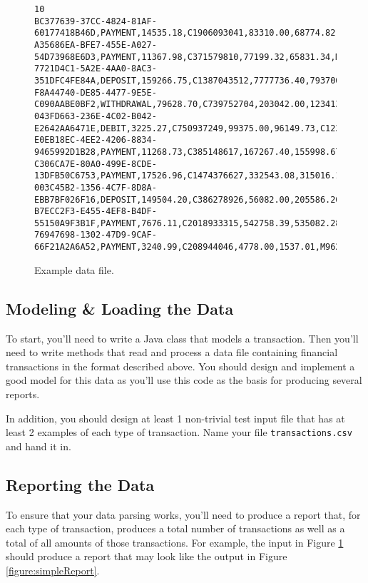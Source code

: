 \documentclass[12pt]{scrartcl}
\begin{document}
\begin{figure}[ht]
\begin{verbatim}
10
BC377639-37CC-4824-81AF-60177418B46D,PAYMENT,14535.18,C1906093041,83310.00,68774.82,M95867054
A35686EA-BFE7-455E-A027-54D73968E6D3,PAYMENT,11367.98,C371579810,77199.32,65831.34,M1932650331
7721D4C1-5A2E-4AA0-8AC3-351DFC4FE84A,DEPOSIT,159266.75,C1387043512,7777736.40,7937003.15,C553899299
F8A44740-DE85-4477-9E5E-C090AABE0BF2,WITHDRAWAL,79628.70,C739752704,203042.00,123413.30,C579345824
043FD663-236E-4C02-B042-E2642AA6471E,DEBIT,3225.27,C750937249,99375.00,96149.73,C1232504595
E0EB18EC-4EE2-4206-8834-9465992D1B28,PAYMENT,11268.73,C385148617,167267.40,155998.67,M1084205719
C306CA7E-80A0-499E-8CDE-13DFB50C6753,PAYMENT,17526.96,C1474376627,332543.08,315016.12,M1944361847
003C45B2-1356-4C7F-8D8A-EBB7BF026F16,DEPOSIT,149504.20,C386278926,56082.00,205586.20,C1113941243
B7ECC2F3-E455-4EF8-B4DF-55150A9F3B1F,PAYMENT,7676.11,C2018933315,542758.39,535082.28,M1018630839
76947698-1302-47D9-9CAF-66F21A2A6A52,PAYMENT,3240.99,C208944046,4778.00,1537.01,M962275185
\end{verbatim}
\caption{Example data file.}
\label{figure:dataFile}
\end{figure}

\subsection*{Modeling \& Loading the Data}

To start, you'll need to write a Java class that models a transaction.  Then
you'll need to write methods that read and process a data file containing 
financial transactions in the format described above.  
You should design and implement a good model for this data as you'll use 
this code as the basis for producing several reports.

In addition, you should design at least 1 non-trivial test input file that 
has at least 2 examples of each type of transaction.  Name your
file \texttt{transactions.csv} and hand it in.

\subsection*{Reporting the Data}

To ensure that your data parsing works, you'll need to produce a report
that, for each type of transaction, produces a total number of transactions 
as well as a total of all amounts of those transactions.  For example, 
the input in Figure \ref{figure:dataFile} should produce a report that
may look like the output in Figure \ref{figure:simpleReport}.
\end{document}
